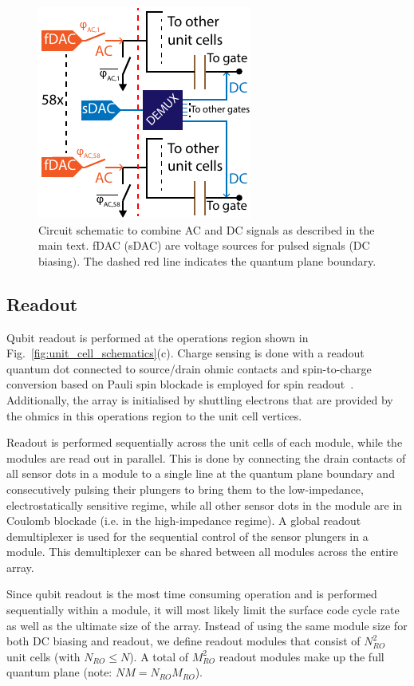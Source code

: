 \documentclass[aps,prl,reprint,superscriptaddress,floatfix]{revtex4-1}
\begin{document}
\begin{figure}[!b]
    \centering
    \includegraphics[height=0.35\textwidth]{Figure_5_DC-AC.pdf}
    \caption{Circuit schematic to combine AC and DC signals as described in the main text. fDAC (sDAC) are voltage sources for pulsed signals (DC biasing). The dashed red line indicates the quantum plane boundary.}
    \label{fig:dc+ac}
\end{figure}

\subsection{Readout}
Qubit readout is performed at the operations region shown in Fig.~\ref{fig:unit_cell_schematics}(c).
Charge sensing is done with a readout quantum dot connected to source/drain ohmic contacts and spin-to-charge conversion based on Pauli spin blockade is employed for spin readout~\cite{Zwanenburg2013}.
Additionally, the array is initialised by shuttling electrons that are provided by the ohmics in this operations region to the unit cell vertices.

Readout is performed sequentially across the unit cells of each module, while the modules are read out in parallel.
This is done by connecting the drain contacts of all sensor dots in a module to a single line at the quantum plane boundary and consecutively pulsing their plungers to bring them to the low-impedance, electrostatically sensitive regime, while all other sensor dots in the module are in Coulomb blockade (i.e. in the high-impedance regime).
A global readout demultiplexer is used for the sequential control of the sensor plungers in a module. This demultiplexer can be shared between all modules across the entire array.

Since qubit readout is the most time consuming operation and is performed sequentially within a module, it will most likely limit the surface code cycle rate as well as the ultimate size of the array.
Instead of using the same module size for both DC biasing and readout, we define readout modules that consist of $N_{RO}^2$ unit cells (with $N_{RO} \leq N$).
A total of $M_{RO}^2$ readout modules make up the full quantum plane (note: $NM = N_{RO}M_{RO}$).
\end{document}
